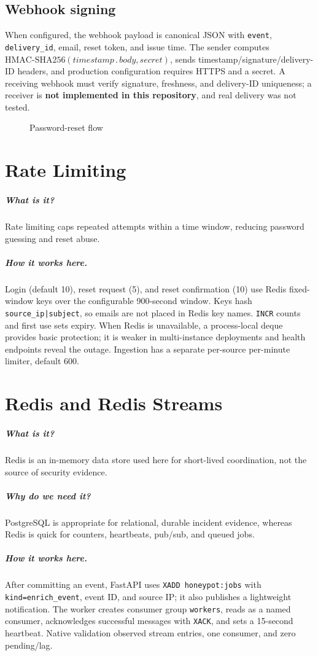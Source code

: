 \documentclass[11pt,oneside]{book}
\newcommand{\what}[1]{\paragraph{What is it?}#1}
\newcommand{\why}[1]{\paragraph{Why do we need it?}#1}
\newcommand{\how}[1]{\paragraph{How it works here.}#1}
\begin{document}
\section{Webhook signing}When configured, the webhook payload is canonical JSON with \texttt{event}, \texttt{delivery\_id}, email, reset token, and issue time. The sender computes \(\mathrm{HMAC\mbox{-}SHA256}(timestamp \mathbin{.} body, secret)\), sends timestamp/signature/delivery-ID headers, and production configuration requires HTTPS and a secret. A receiving webhook must verify signature, freshness, and delivery-ID uniqueness; a receiver is \textbf{not implemented in this repository}, and real delivery was not tested.
\begin{figure}[h]\centering{}\caption{Password-reset flow}\end{figure}

\chapter{Rate Limiting}
\what{Rate limiting caps repeated attempts within a time window, reducing password guessing and reset abuse.}\how{Login (default 10), reset request (5), and reset confirmation (10) use Redis fixed-window keys over the configurable 900-second window. Keys hash \texttt{source\_ip|subject}, so emails are not placed in Redis key names. \texttt{INCR} counts and first use sets expiry. When Redis is unavailable, a process-local deque provides basic protection; it is weaker in multi-instance deployments and health endpoints reveal the outage. Ingestion has a separate per-source per-minute limiter, default 600.}

\chapter{Redis and Redis Streams}
\what{Redis is an in-memory data store used here for short-lived coordination, not the source of security evidence.}\why{PostgreSQL is appropriate for relational, durable incident evidence, whereas Redis is quick for counters, heartbeats, pub/sub, and queued jobs.}\how{After committing an event, FastAPI uses \texttt{XADD honeypot:jobs} with \texttt{kind=enrich\_event}, event ID, and source IP; it also publishes a lightweight notification. The worker creates consumer group \texttt{workers}, reads as a named consumer, acknowledges successful messages with \texttt{XACK}, and sets a 15-second heartbeat. Native validation observed stream entries, one consumer, and zero pending/lag.}
\end{document}
